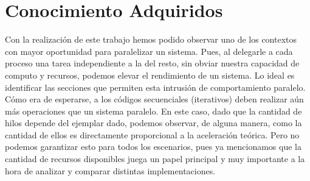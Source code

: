 \documentclass[10pt,letterpaper]{article}
\begin{document}
\section*{Conocimiento Adquiridos} 
Con la realización de este trabajo hemos podido observar uno de los contextos con mayor oportunidad para paralelizar un sistema. Pues, al delegarle a cada proceso una tarea independiente a la del resto, sin obviar nuestra capacidad de computo y recursos, podemos elevar el rendimiento de un sistema. Lo ideal es identificar las secciones que permiten esta intrusión de comportamiento paralelo. Cómo era de esperarse, a los códigos secuenciales (iterativos) deben realizar aún más operaciones que un sistema paralelo. En este caso, dado que la cantidad de hilos depende del ejemplar dado, podemos observar, de alguna manera, como la cantidad de ellos es directamente proporcional a la aceleración teórica. Pero no podemos garantizar esto para todos los escenarios, pues ya mencionamos que la cantidad de recursos disponibles juega un papel principal y muy importante a la hora de analizar y comparar distintas implementaciones.
\end{document}
